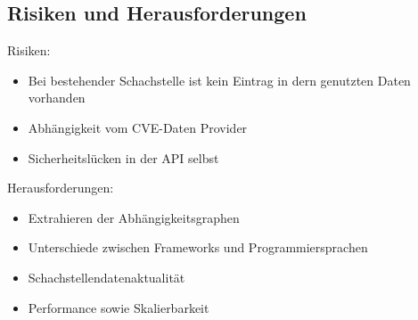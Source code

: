\subsection{Risiken und Herausforderungen} \label{sec:Risiken und Herausforderungen}
Risiken:
\begin{itemize}
    \item Bei bestehender Schachstelle ist kein Eintrag in dern genutzten Daten vorhanden
    \item Abhängigkeit vom CVE-Daten Provider
    \item Sicherheitslücken in der API selbst
\end{itemize}
Herausforderungen:
\begin{itemize}
    \item Extrahieren der Abhängigkeitsgraphen
    \item Unterschiede zwischen Frameworks und Programmiersprachen
    \item Schachstellendatenaktualität
    \item Performance sowie Skalierbarkeit
\end{itemize}